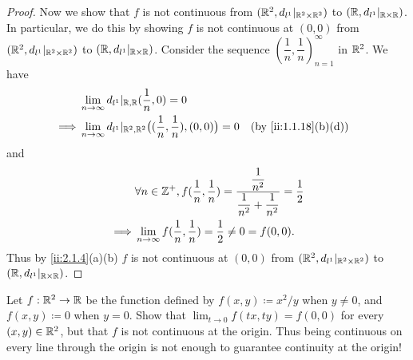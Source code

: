 \begin{proof}
  Now we show that \(f\) is not continuous from \((\mathbb{R}^2, d_{l^1}|_{\mathbb{R}^2 \times \mathbb{R}^2})\) to \((\mathbb{R}, d_{l^1}|_{\mathbb{R} \times \mathbb{R}})\).
  In particular, we do this by showing \(f\) is not continuous at \((0, 0)\) from \((\mathbb{R}^2, d_{l^1}|_{\mathbb{R}^2 \times \mathbb{R}^2})\) to \((\mathbb{R}, d_{l^1}|_{\mathbb{R} \times \mathbb{R}})\).
  Consider the sequence \((\dfrac{1}{n}, \dfrac{1}{n})_{n = 1}^\infty\) in \(\mathbb{R}^2\).
  We have
  \begin{align*}
             & \lim_{n \to \infty} d_{l^1}|_{\R, \R}(\dfrac{1}{n}, 0) = 0                                                           \\
    \implies & \lim_{n \to \infty} d_{l^1}|_{\R^2, \R^2}\big((\dfrac{1}{n}, \dfrac{1}{n}), (0, 0)\big) = 0 &  & \by{ii:1.1.18}[b,d]
  \end{align*}
  and
  \begin{align*}
             & \forall n \in \mathbb{Z}^+, f(\dfrac{1}{n}, \dfrac{1}{n}) = \dfrac{\dfrac{1}{n^2}}{\dfrac{1}{n^2} + \dfrac{1}{n^2}} = \dfrac{1}{2} \\
    \implies & \lim_{n \to \infty} f(\dfrac{1}{n}, \dfrac{1}{n}) = \dfrac{1}{2} \neq 0 = f(0, 0).
  \end{align*}
  Thus by \cref{ii:2.1.4}(a)(b) \(f\) is not continuous at \((0, 0)\) from \((\mathbb{R}^2, d_{l^1}|_{\mathbb{R}^2 \times \mathbb{R}^2})\) to \((\mathbb{R}, d_{l^1}|_{\mathbb{R} \times \mathbb{R}})\).
\end{proof}

\begin{ex}\label{ii:ex:2.2.12}
  Let \(f: \mathbb{R}^2 \to \mathbb{R}\) be the function defined by \(f(x, y) \coloneqq x^2 / y\) when \(y \neq 0\), and \(f(x, y) \coloneqq 0\) when \(y = 0\).
  Show that \(\lim_{t \to 0} f(tx, ty) = f(0, 0)\) for every \((x, y) \in \mathbb{R}^2\), but that \(f\) is not continuous at the origin.
  Thus being continuous on every line through the origin is not enough to guarantee continuity at the origin!
\end{ex}

